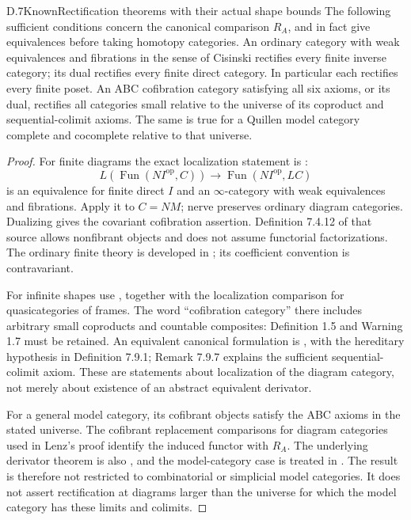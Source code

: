 \begin{result}{D.7}{Known}{Rectification theorems with their actual shape bounds}
The following sufficient conditions concern the canonical comparison
$R_A$, and in fact give equivalences before taking homotopy categories.
An ordinary category with weak equivalences and fibrations in the
sense of Cisinski rectifies every finite inverse category; its dual
rectifies every finite direct category. In particular each rectifies
every finite poset. An ABC cofibration category satisfying all six
axioms, or its dual, rectifies all categories small relative to the
universe of its coproduct and sequential-colimit axioms. The same is
true for a Quillen model category complete and cocomplete relative
to that universe.
\end{result}
\begin{proof}
For finite diagrams the exact localization statement is
\citet[Theorem 7.6.17]{DCisinski2019}:
\[
 L(\operatorname{Fun}(N I^{\mathrm{op}},C))
       \longrightarrow\operatorname{Fun}(N I^{\mathrm{op}},L C)
\]
is an equivalence for finite direct $I$ and an $\infty$-category with
weak equivalences and fibrations. Apply it to $C=NM$; nerve preserves
ordinary diagram categories. Dualizing gives the covariant
cofibration assertion. Definition 7.4.12 of that source allows
nonfibrant objects and does not assume functorial factorizations.
The ordinary finite theory is developed in
\citet[Definition 1.1, Theorems 1.30 and 2.21, and Corollary
3.20]{DCisinski2010}; its coefficient convention is contravariant.

For infinite shapes use \citet[Theorem 3.33]{DLenz2018}, together
with the localization comparison for quasicategories of frames.
The word ``cofibration category'' there includes arbitrary small
coproducts and countable composites: Definition 1.5 and Warning 1.7
must be retained. An equivalent canonical formulation is
\citet[Theorem 7.9.8]{DCisinski2019}, with the hereditary hypothesis
in Definition 7.9.1; Remark 7.9.7 explains the sufficient
sequential-colimit axiom. These are statements about localization
of the diagram category, not merely about existence of an abstract
equivalent derivator.

For a general model category, its cofibrant objects satisfy the ABC
axioms in the stated universe. The cofibrant replacement comparisons
for diagram categories used in Lenz's proof identify the induced
functor with $R_A$. The underlying derivator theorem is also
\citet[Corollaire 6.21]{DCisinski2010},
and the model-category case is treated in
\citet[Th\'eor\`eme 6.11]{DCisinski2003}. The result is therefore not restricted to
combinatorial or simplicial model categories. It does not assert
rectification at diagrams larger than the universe for which the
model category has these limits and colimits.
\end{proof}

